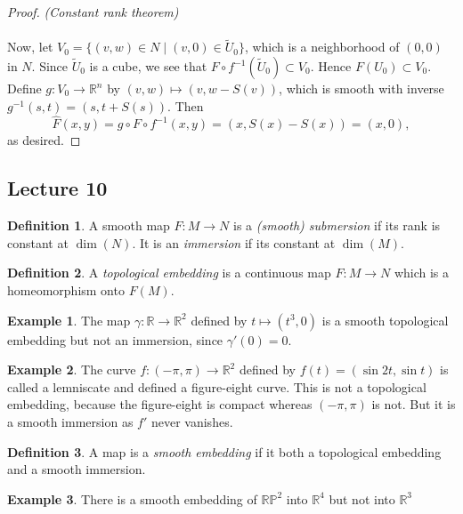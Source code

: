 \documentclass[10pt,letterpaper,cm]{nupset}
\theoremstyle{definition}
\newtheorem*{definition}{Definition}
\newtheorem{exmp}{Example}
\newcommand{\R}{\mathbb R}
\newcommand{\RP}{\mathbb{RP}}
\newcommand{\1}{\mathbf{1}}
\newcommand{\0}{\vec 0}
\begin{document}
\begin{proof}{\textit{(Constant rank theorem)}}
\\ \\ Now, let $V_0 = \{(v,w) \in N \mid (v,0)\in \widetilde{U}_0\}$, which is a neighborhood of $(0,0)$ in  $N$. Since $\widetilde{U}_0$ is a cube, we see that $F \circ f^{-1}(\widetilde{U}_0) \subset V_0$. Hence $F(U_0) \subset V_0$.  Define $g : V_0 \to \R^n$ by $(v,w) \mapsto (v, w-S(v))$, which is smooth with inverse $g^{-1}(s,t) = (s, t + S(s))$. Then $$\widehat{F}(x,y) = g \circ F \circ f^{-1}(x,y) = (x, S(x) - S(x)) = (x,0),$$ as desired.
\end{proof}

\subsection{Lecture 10}

\begin{definition}
A smooth map $F: M \to N$ is a \textit{(smooth) submersion} if its rank is constant at $\dim(N)$. It is an \textit{immersion} if its constant at $\dim(M)$.
\end{definition}

\begin{definition}
A \textit{topological embedding} is a continuous map $F: M \to N$ which is a homeomorphism onto $F(M)$.
\end{definition}

\begin{exmp}
The map $\gamma: \R \to \R^2$ defined by $t\mapsto (t^3, 0)$ is a smooth topological embedding but not an immersion, since $\gamma'(0) =0$.
\end{exmp}

\begin{exmp}
The curve $f: (-\pi, \pi) \to \R^2$ defined by $f(t) = (\sin 2t , \sin t)$ is called a lemniscate and defined a figure-eight curve. This is not a topological embedding, because the figure-eight is compact whereas $(-\pi, \pi)$ is not. But it is a smooth immersion as $f'$ never vanishes. 
\end{exmp}

\begin{definition}
A map is a \textit{smooth embedding} if it both a topological embedding and a smooth immersion.
\end{definition}

\begin{exmp}
There is a smooth embedding of $\RP^2$ into $\R^4$ but not into $\R^3$
\end{exmp}
\end{document}
